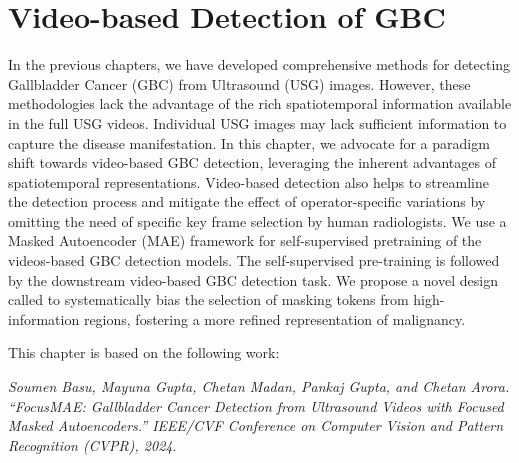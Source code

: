 \chapter{Video-based Detection of GBC}
%
\label{chap:focusmae}
%
%

In the previous chapters, we have developed comprehensive methods for detecting Gallbladder Cancer (GBC) from Ultrasound (USG) images. However, these methodologies lack the advantage of the rich spatiotemporal information available in the full USG videos. Individual USG images may lack sufficient information to capture the disease manifestation. In this chapter, we advocate for a paradigm shift towards video-based GBC detection, leveraging the inherent advantages of spatiotemporal representations. Video-based detection also helps to streamline the detection process and mitigate the effect of operator-specific variations by omitting the need of specific key frame selection by human radiologists. We use a Masked Autoencoder (MAE) framework for self-supervised pretraining of the videos-based GBC detection models. The self-supervised pre-training is followed by the downstream video-based GBC detection task.
We propose a novel design called \focusmae to systematically bias the selection of masking tokens from high-information regions, fostering a more refined representation of malignancy. %

This chapter is based on the following work:
\par \noindent [1] \textit{Soumen Basu, Mayuna Gupta, Chetan Madan, Pankaj Gupta, and Chetan Arora. ``FocusMAE: Gallbladder Cancer Detection from Ultrasound Videos with Focused Masked Autoencoders.'' IEEE/CVF Conference on Computer Vision and Pattern Recognition (CVPR), 2024}.
















